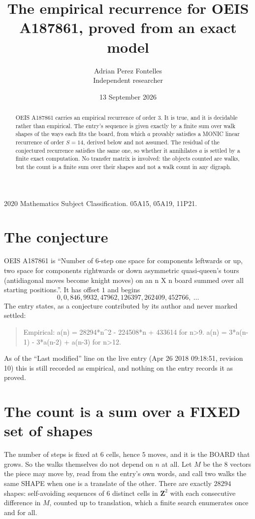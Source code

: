 \documentclass[11pt,a4paper]{article}
\title{The empirical recurrence for OEIS A187861, proved from an exact model}
\author{Adrian Perez Fontelles\\ \small Independent researcher}
\date{13 September 2026}
\theoremstyle{plain}
\theoremstyle{definition}
\begin{document}
\maketitle

\begin{abstract}
OEIS A187861 carries an empirical recurrence of order $3$. It is true, and it is
decidable rather than empirical. The entry's sequence is given exactly by a finite sum over walk shapes of the ways each fits the board, from
which $a$ provably satisfies a MONIC linear recurrence of order $S=14$, derived below and not
assumed. The residual of the conjectured recurrence satisfies the same one, so whether it
annihilates $a$ is settled by a finite exact computation. No transfer matrix is involved: the objects counted are walks, but the count is a finite sum over their shapes and not a walk count in any digraph.
\end{abstract}

\noindent\small 2020 Mathematics Subject Classification. 05A15, 05A19, 11P21.\normalsize

\section{The conjecture}

OEIS A187861 is ``Number of 6-step one space for components leftwards or up, two space for components rightwards or down asymmetric quasi-queen's tours (antidiagonal moves become knight moves) on an n X n board summed over all starting positions.''. It has offset $1$ and begins
\[
0, 0, 846, 9932, 47962, 126397, 262409, 452766,\ \dots
\]
The entry states, as a conjecture contributed by its author and never marked settled:
\begin{quote}
Empirical: a(n) = 28294*n\^{}2 - 224508*n + 433614 for n>9. a(n) = 3*a(n-1) - 3*a(n-2) + a(n-3) for n>12.
\end{quote}
As of the ``Last modified'' line on the live entry (Apr 26 2018 09:18:51, revision 10)
this is still recorded as empirical, and nothing on the entry records it as proved.

\section{The count is a sum over a FIXED set of shapes}

The number of steps is fixed at $6$ cells, hence $5$ moves, and it is the BOARD
that grows. So the walks themselves do not depend on $n$ at all. Let $M$ be the $8$
vectors the piece may move by, read from the entry's own words, and call two walks the same
SHAPE when one is a translate of the other. There are exactly $28294$ shapes: self-avoiding
sequences of $6$ distinct cells in $\mathbf{Z}^{2}$ with each consecutive difference in
$M$, counted up to translation, which a finite search enumerates once and for all.
\end{document}
